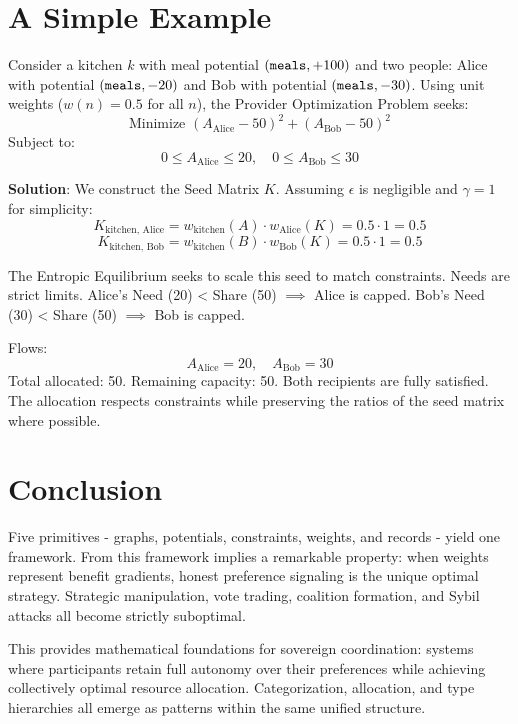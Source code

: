 \documentclass[11pt]{article}
\begin{document}
\section{A Simple Example}

Consider a kitchen $k$ with meal potential $({\tt meals}, +100)$ and two people: Alice with potential $({\tt meals}, -20)$ and Bob with potential $({\tt meals}, -30)$. Using unit weights ($w(n) = 0.5$ for all $n$), the Provider Optimization Problem seeks:
\[
\text{Minimize } (A_{\text{Alice}} - 50)^2 + (A_{\text{Bob}} - 50)^2
\]
Subject to:
\[
0 \le A_{\text{Alice}} \le 20, \quad 0 \le A_{\text{Bob}} \le 30
\]

\textbf{Solution}:
We construct the Seed Matrix $K$. Assuming $\epsilon$ is negligible and $\gamma=1$ for simplicity:
\[
K_{\text{kitchen, Alice}} = w_{\text{kitchen}}(A) \cdot w_{\text{Alice}}(K) = 0.5 \cdot 1 = 0.5
\]
\[
K_{\text{kitchen, Bob}} = w_{\text{kitchen}}(B) \cdot w_{\text{Bob}}(K) = 0.5 \cdot 1 = 0.5
\]

The Entropic Equilibrium seeks to scale this seed to match constraints.
Needs are strict limits.
Alice's Need (20) < Share (50) $\implies$ Alice is capped.
Bob's Need (30) < Share (50) $\implies$ Bob is capped.

Flows:
\[
A_{\text{Alice}} = 20, \quad A_{\text{Bob}} = 30
\]
Total allocated: 50. Remaining capacity: 50.
Both recipients are fully satisfied. The allocation respects constraints while preserving the ratios of the seed matrix where possible.

\section{Conclusion}

Five primitives - graphs, potentials, constraints, weights, and records - yield one framework. From this framework implies a remarkable property: when weights represent benefit gradients, honest preference signaling is the unique optimal strategy. Strategic manipulation, vote trading, coalition formation, and Sybil attacks all become strictly suboptimal.

This provides mathematical foundations for sovereign coordination: systems where participants retain full autonomy over their preferences while achieving collectively optimal resource allocation. Categorization, allocation, and type hierarchies all emerge as patterns within the same unified structure.
\end{document}
